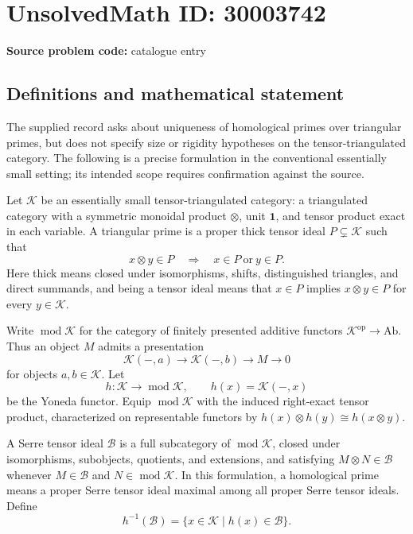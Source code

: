 \documentclass[11pt]{article}
\begin{document}
\section*{UnsolvedMath ID: 30003742}
\textbf{Source problem code:} catalogue entry
\subsection{Definitions and mathematical statement}
The supplied record asks about uniqueness of homological primes over triangular primes, but does not specify size or rigidity hypotheses on the tensor-triangulated category. The following is a precise formulation in the conventional essentially small setting; its intended scope requires confirmation against the source.

Let \(\mathcal K\) be an essentially small tensor-triangulated category: a triangulated category with a symmetric monoidal product \(\otimes\), unit \(\mathbf 1\), and tensor product exact in each variable. A triangular prime is a proper thick tensor ideal \(P\subsetneq\mathcal K\) such that
\[
x\otimes y\in P\quad\Longrightarrow\quad x\in P\ \text{or}\ y\in P.
\]
Here thick means closed under isomorphisms, shifts, distinguished triangles, and direct summands, and being a tensor ideal means that \(x\in P\) implies \(x\otimes y\in P\) for every \(y\in\mathcal K\).

Write \(\operatorname{mod}\mathcal K\) for the category of finitely presented additive functors \(\mathcal K^{\mathrm{op}}\to\mathrm{Ab}\). Thus an object \(M\) admits a presentation
\[
\mathcal K(-,a)\longrightarrow\mathcal K(-,b)\longrightarrow M\longrightarrow0
\]
for objects \(a,b\in\mathcal K\). Let
\[
h\colon\mathcal K\longrightarrow\operatorname{mod}\mathcal K,
\qquad h(x)=\mathcal K(-,x)
\]
be the Yoneda functor. Equip \(\operatorname{mod}\mathcal K\) with the induced right-exact tensor product, characterized on representable functors by \(h(x)\otimes h(y)\cong h(x\otimes y)\).

A Serre tensor ideal \(\mathcal B\) is a full subcategory of \(\operatorname{mod}\mathcal K\), closed under isomorphisms, subobjects, quotients, and extensions, and satisfying \(M\otimes N\in\mathcal B\) whenever \(M\in\mathcal B\) and \(N\in\operatorname{mod}\mathcal K\). In this formulation, a homological prime means a proper Serre tensor ideal maximal among all proper Serre tensor ideals. Define
\[
h^{-1}(\mathcal B)=\{x\in\mathcal K\mid h(x)\in\mathcal B\}.
\]
\end{document}
